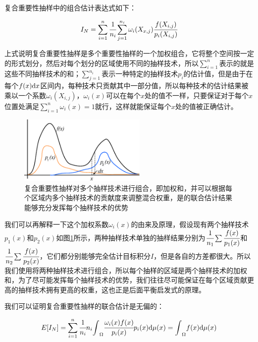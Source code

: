 复合重要性抽样中的组合估计表达式如下：

\begin{equation}\label{e:combined-estimator}
	I_N=\sum_{i=1}^{n} \cfrac{1}{n_i}\sum_{j=1}^{n_i}\omega_i(X_{x,j}) \cfrac{f(X_{i,j})}{p_i(X_{i,j})}
\end{equation}

上式说明复合重要性抽样是多个重要性抽样的一个加权组合，它将整个空间按一定的形式划分，然后对每个划分的区域使用不同的抽样技术，所以$\sum^{n}_{i=1}$表示的就是这些不同抽样技术的和；$\sum^{n_i}_{j=1}$表示一种特定的抽样技术$p_i$的估计值，但是由于在每个$f(x){\rm d}x$区间内，每种技术只贡献其中一部分值，所以每种技术的估计结果被乘以一个系数$\omega_i(X_{i,j})$，$\omega_i(x)$可以在每个$x$处的值不一样，只要保证对于每个$x$位置处满足$\sum^{n}_{i=1}\omega_i(x)=1$就行，这样就能保证每个$x$处的值被正确估计。

\begin{figure}
	\sidecaption
	\includegraphics[width=0.55\textwidth]{figures/mc/mis}
	\caption{复合重要性抽样对多个抽样技术进行组合，即加权和，并可以根据每个区域内多个抽样技术的贡献度来调整混合权重，是的联合估计结果能够充分发挥每个抽样技术的优势}
	\label{f:mc-mis-example}
\end{figure}

我们可以再解释一下这个加权系数$\omega_i(x)$的由来及原理，假设现有两个抽样技术$p_1(x)$和$p_2(x)$如图\ref{f:mc-mis-example}所示，两种抽样技术单独的抽样结果分别为$ \cfrac{1}{n_1}\sum \cfrac{f(x)}{p_1(x)}$和$ \cfrac{1}{n_2}\sum \cfrac{f(x)}{p_2(x)}$，它们都分别能够完全估计目标积分$I$，但是各自的方差都很大。所以我们使用将两种抽样技术进行组合，所以每个抽样的区域是两个抽样技术的加权和，为了尽可能发挥每个抽样技术的优势，我们往往尽可能保证在每个区域贡献更高的抽样技术拥有更高的权重，这也正是后面平衡启发式的原理。

我们可以证明复合重要性抽样的联合估计是无偏的：

\begin{equation}
	E[I_N]=\sum_{i=1}^{n} \cfrac{1}{n_i}n_i{\rm \int}_{\Omega} \cfrac{\omega_i(x)f(x)}{p_i(x)}p_i(x){\rm d}\mu (x)={\rm \int}_{\Omega}f(x){\rm d}\mu (x)
\end{equation}

